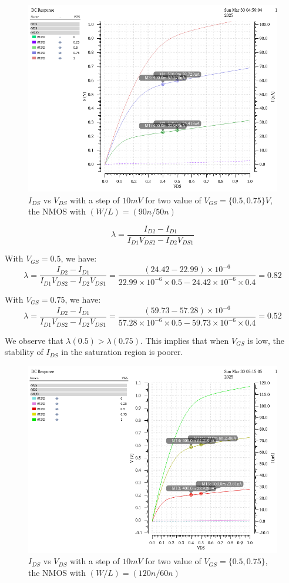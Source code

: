 \begin{figure}[H]
	\centering
	\includegraphics[width=0.6\linewidth]{sections/pic/EX3_NMOS_lambda_(w_l)(90_50).png}
	\caption{$I_{DS}$ vs $V_{DS}$ with a step of $10mV$ for two value of $V_{GS} = \{0.5, 0.75\} V$, the NMOS with $(W/L) = (90n/50n)$}
	\label{f_EX3_NMOS_lambda_(w_l)(90_50)}
\end{figure}

\[ \lambda = \dfrac{I_{D2} - I_{D1}}{I_{D1} V_{DS2} - I_{D2} V_{DS1}} \]

With $V_{GS} = 0.5$, we have:
\[ \lambda = \dfrac{I_{D2} - I_{D1}}{I_{D1} V_{DS2} - I_{D2} V_{DS1}} = \dfrac{(24.42 - 22.99)\times 10^{-6}}{22.99\times 10^{-6}\times 0.5 - 24.42 \times 10^{-6} \times 0.4 }  = 0.82\]

With $V_{GS} = 0.75$, we have:
\[ \lambda = \dfrac{I_{D2} - I_{D1}}{I_{D1} V_{DS2} - I_{D2} V_{DS1}} = \dfrac{(59.73 - 57.28)\times 10^{-6}}{57.28\times 10^{-6}\times 0.5 - 59.73 \times 10^{-6} \times 0.4 }  = 0.52\]

We observe that $\lambda(0.5) > \lambda(0.75)$. This implies that when $V_{GS}$ is low, the stability of $I_{DS}$ in the saturation region is poorer.\\ 


\begin{figure}[H]
	\centering
	\includegraphics[width=.6\linewidth]{sections/pic/EX3_NMOS_lambda_(w_l)(120_90)(vgs_0_5).png}
	\caption{$I_{DS}$ vs $V_{DS}$ with a step of $10mV$ for two value of $V_{GS} = \{0.5, 0.75\}$, the NMOS with $(W/L) = (120n/60n)$}
	\label{f_EX3_NMOS_lambda_(w_l)(120_90)(vgs_0_5)}
\end{figure}


